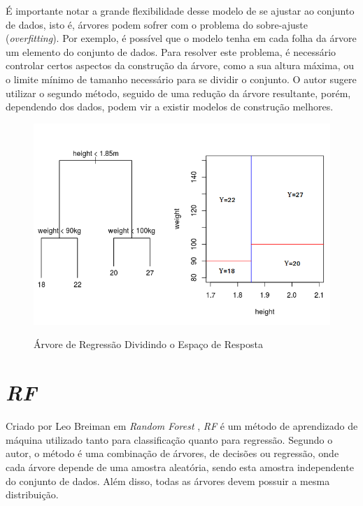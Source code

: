 É importante notar a grande flexibilidade desse modelo de se ajustar ao conjunto de dados, isto é, árvores podem sofrer com o problema do sobre-ajuste (\textit{overfitting}). Por exemplo, é possível que o modelo tenha em cada folha da árvore um elemento do conjunto de dados. Para resolver este problema, é necessário controlar certos aspectos da construção da árvore, como a sua altura máxima, ou o limite mínimo de tamanho necessário para se dividir o conjunto. O autor sugere utilizar o segundo método, seguido de uma redução da árvore resultante, porém, dependendo dos dados, podem vir a existir modelos de construção melhores.
 
 \begin{figure}[htbp]
    \centering
    \includegraphics[scale=0.6]{monography/img/models/regression_tree.png}
    \label{figure:tree}
    \caption[Árvore de Regressão Dividindo o Espaço de Resposta]{Árvore de Regressão Dividindo o Espaço de Resposta\footnotemark}
\end{figure}


\section{\textit{\acrfull{RF}}}

Criado por Leo Breiman em \textit{Random Forest} \cite{Breiman:2001:RF:570181.570182}, \textit{\acrshort{RF}} é um método de aprendizado de máquina utilizado tanto para classificação quanto para regressão. Segundo o autor, o método é uma combinação de árvores, de decisões ou regressão, onde cada árvore depende de uma amostra aleatória, sendo esta amostra independente do conjunto de dados. Além disso, todas as árvores devem possuir a mesma distribuição. 


